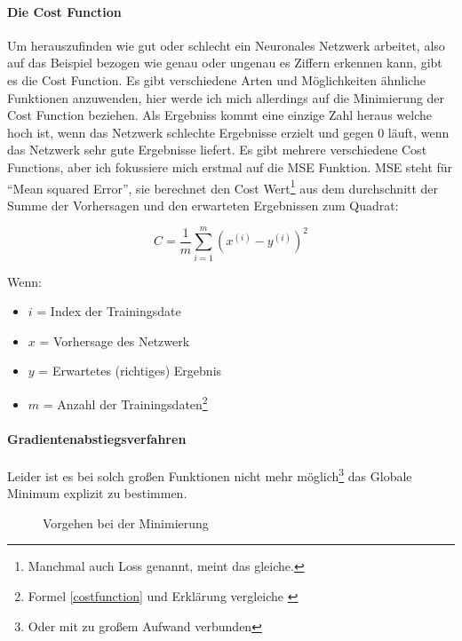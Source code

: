 \paragraph{Die Cost Function}\label{paracost}

Um herauszufinden wie gut oder schlecht ein Neuronales Netzwerk arbeitet, also auf das Beispiel bezogen wie genau oder ungenau es Ziffern erkennen kann, gibt es die Cost Function. Es gibt verschiedene Arten und Möglichkeiten ähnliche Funktionen anzuwenden, hier werde ich mich allerdings auf die Minimierung der Cost Function beziehen. Als Ergebniss kommt eine einzige Zahl heraus welche hoch ist, wenn das Netzwerk schlechte Ergebnisse erzielt und gegen 0 läuft, wenn das Netzwerk sehr gute Ergebnisse liefert. Es gibt mehrere verschiedene Cost Functions, aber ich fokussiere mich erstmal auf die MSE Funktion. MSE steht für "`Mean squared Error"', sie berechnet den Cost Wert\footnote{Manchmal auch Loss genannt, meint das gleiche.} aus dem durchschnitt der Summe der Vorhersagen und den erwarteten Ergebnissen zum Quadrat:

\begin{equation}\label{costfunction}
    C = \frac{1}{m} \sum^{m}_{i=1}(x^{(i)}-y^{(i)})^2
\end{equation}

Wenn:

\begin{itemize}
    \item $i$ = Index der Trainingsdate
    \item $x$ = Vorhersage des Netzwerk
    \item $y$ = Erwartetes (richtiges) Ergebnis
    \item $m$ = Anzahl der Trainingsdaten\footnote{Formel \ref{costfunction} und Erklärung vergleiche \cite{towardsds}}
\end{itemize}

\paragraph{Gradientenabstiegsverfahren}\label{paragrad}

Leider ist es bei solch großen Funktionen nicht mehr möglich\footnote{Oder mit zu großem Aufwand verbunden} das Globale Minimum explizit zu bestimmen.

\begin{figure}
    
    \caption[2dcost]{Vorgehen bei der Minimierung}
    \label{2dcost}
\end{figure}

